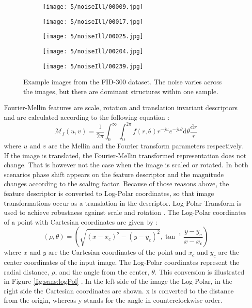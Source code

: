 \documentclass[draft,final]{vutinfth} %
\begin{document}
\begin{figure}[h]
\centering
  \begin{subfigure}[t]{0.19\columnwidth}
    \centering
    \texttt{[image: 5/noiseIll/00009.jpg]}
  \end{subfigure}
  \begin{subfigure}[t]{0.19\columnwidth}
    \centering
    \texttt{[image: 5/noiseIll/00017.jpg]}
  \end{subfigure}
  \begin{subfigure}[t]{0.19\columnwidth}
    \centering
    \texttt{[image: 5/noiseIll/00025.jpg]}
  \end{subfigure}
  \begin{subfigure}[t]{0.19\columnwidth}
    \centering
    \texttt{[image: 5/noiseIll/00204.jpg]}
  \end{subfigure}
  \begin{subfigure}[t]{0.19\columnwidth}
    \centering
    \texttt{[image: 5/noiseIll/00239.jpg]}
  \end{subfigure}
\caption{Example images from the FID-300 dataset. The noise varies across the images, but there are dominant structures within one sample.}
\label{fig:sans:noiseIll}

\end{figure}
\par
Fourier-Mellin features are scale, rotation and translation invariant descriptors and are calculated according to the following equation \cite{kazik2011visual}:
\begin{equation}
\mathcal{M}_f(u,v) = \frac{1}{2\pi} \int_{0}^{\infty}\int_{0}^{2\pi} f(r, \theta)r^{-ju}e^{-jv\theta}\mathrm{d}\theta\frac{\mathrm{d}r}{r}
\end{equation}
where $u$ and $v$ are the Mellin and the Fourier transform parameters respectively.
If the image is translated, the Fourier-Mellin transformed representation does not change.
That is however not the case when the image is scaled or rotated.
In both scenarios phase shift appears on the feature descriptor and the magnitude changes according to the scaling factor.
Because of those reasons above, the feature descriptor is converted to Log-Polar coordinates, so that image transformations occur as a translation in the descriptor.
Log-Polar Transform is used to achieve robustness against scale and rotation  \cite{gueham2008automatic}.
The Log-Polar coordinates of a point with Cartesian coordinates are given by \cite{sarvaiya2012image}:
\begin{equation}
(\rho,\theta) = (\sqrt{(x-x_c)^2 - (y-y_c)^2}, \tan^{-1}\frac{y-y_c}{x-x_c})
\end{equation}
where $x$ and $y$ are the Cartesian coordinates of the point and $x_c$ and $y_c$ are the center coordinates of the input image.
The Log-Polar coordinates represent the radial distance, $\rho$, and the angle from the center, $\theta$.
This conversion is illustrated in Figure \ref{fig:sans:logPol} \cite{sarvaiya2012image}.
In the left side of the image the Log-Polar, in the right side the Cartesian coordinates are shown.
x is converted to the distance from the origin, whereas y stands for the angle in counterclockwise order.
\end{document}
